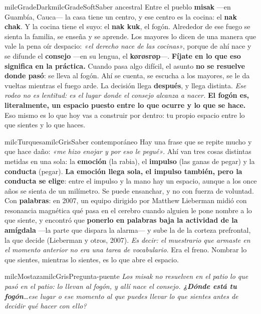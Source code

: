 \documentclass[11pt,letterpaper]{article}
\begin{document}
\begin{softbox}{milcGradeDark}{milcGradeSoft}{Saber ancestral}
Entre el pueblo \textbf{misak} ---en Guambía, Cauca--- la casa tiene un centro, y ese centro es la cocina: el \textbf{nak chak}. Y la cocina tiene el suyo: el \textbf{nak kuk}, el fogón. Alrededor de ese fuego se sienta la familia, se enseña y se aprende. Los mayores lo dicen de una manera que vale la pena oír despacio: \emph{«el derecho nace de las cocinas»}, porque de ahí nace y se difunde el \textbf{consejo} ---en su lengua, el \textbf{kørøsrøp}---. \textbf{Fíjate en lo que eso significa en la práctica.} Cuando pasa algo difícil, el asunto \textbf{no se resuelve donde pasó}: se lleva al fogón. Ahí se cuenta, se escucha a los mayores, se le da vueltas mientras el fuego arde. La decisión llega \textbf{después}, y llega distinta. \emph{Ese rodeo no es lentitud: es el lugar donde el consejo alcanza a nacer.} \textbf{El fogón es, literalmente, un espacio puesto entre lo que ocurre y lo que se hace.} Eso mismo es lo que hoy vas a construir por dentro: tu propio espacio entre lo que sientes y lo que haces.
\end{softbox}

\begin{softbox}{milcTurquesa}{milcGris}{Saber contemporáneo}
Hay una frase que se repite mucho y que hace daño: \emph{«me hizo enojar y por eso le pegué»}. Ahí van tres cosas distintas metidas en una sola: la \textbf{emoción} (la rabia), el \textbf{impulso} (las ganas de pegar) y la \textbf{conducta} (pegar). \textbf{La emoción llega sola, el impulso también, pero la conducta se elige}: entre el impulso y la mano hay un espacio, aunque a los once años se sienta de un milímetro. Se puede ensanchar, y no con fuerza de voluntad. Con \textbf{palabras}: en 2007, un equipo dirigido por Matthew Lieberman midió con resonancia magnética qué pasa en el cerebro cuando alguien le pone nombre a lo que siente, y encontró que \textbf{ponerlo en palabras baja la actividad de la amígdala} ---la parte que dispara la alarma--- y sube la de la corteza prefrontal, la que decide (Lieberman y otros, 2007). \emph{Es decir: el muestrario que armaste en el momento anterior no era una tarea de vocabulario.} Era el freno. Nombrar lo que sientes, mientras lo sientes, es lo que abre el espacio.
\end{softbox}

\begin{softbox}{milcMostaza}{milcGris}{Pregunta-puente}
\textit{Los misak no resuelven en el patio lo que pasó en el patio: lo llevan al fogón, y allí nace el consejo. \textbf{¿Dónde está tu fogón}\ldots ese lugar o ese momento al que puedes llevar lo que sientes antes de decidir qué hacer con ello?}
\end{softbox}
\end{document}
